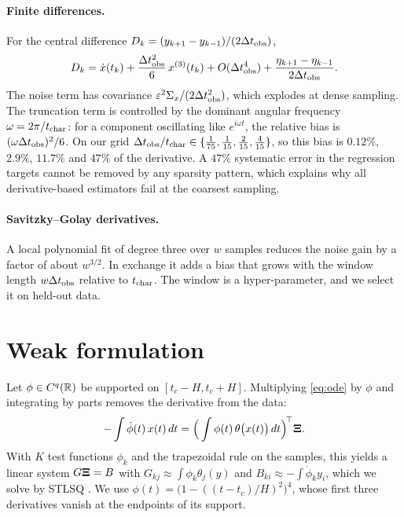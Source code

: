 \paragraph{Finite differences.} For the central difference $D_k=(y_{k+1}-y_{k-1})/(2\Delta t_{\mathrm{obs}})$,
\begin{equation}\label{eq:fd}
  D_k = \dot x(t_k) + \frac{\Delta t_{\mathrm{obs}}^2}{6}\,x^{(3)}(t_k) + O(\Delta t_{\mathrm{obs}}^4) + \frac{\eta_{k+1}-\eta_{k-1}}{2\Delta t_{\mathrm{obs}}}.
\end{equation}
The noise term has covariance $\varepsilon^2\Sigma_x/(2\Delta t_{\mathrm{obs}}^2)$, which explodes at dense sampling. The truncation term is controlled by the dominant angular frequency $\omega=2\pi/t_{\mathrm{char}}$: for a component oscillating like $e^{i\omega t}$, the relative bias is $(\omega\Delta t_{\mathrm{obs}})^2/6$. On our grid $\Delta t_{\mathrm{obs}}/t_{\mathrm{char}}\in\{\tfrac{1}{75},\tfrac{1}{15},\tfrac{2}{15},\tfrac{4}{15}\}$, so this bias is $0.12\%$, $2.9\%$, $11.7\%$ and $47\%$ of the derivative. A $47\%$ systematic error in the regression targets cannot be removed by any sparsity pattern, which explains why all derivative-based estimators fail at the coarsest sampling.

\paragraph{Savitzky--Golay derivatives.} A local polynomial fit of degree three over $w$ samples \parencite{savitzky1964} reduces the noise gain by a factor of about $w^{3/2}$. In exchange it adds a bias that grows with the window length $w\Delta t_{\mathrm{obs}}$ relative to $t_{\mathrm{char}}$. The window is a hyper-parameter, and we select it on held-out data.

\section{Weak formulation}

Let $\phi\in C^{q}(\mathbb{R})$ be supported on $[t_c-H,t_c+H]$. Multiplying \eqref{eq:ode} by $\phi$ and integrating by parts removes the derivative from the data:
\begin{equation}\label{eq:weak}
  -\int \dot\phi(t)\,x(t)\,dt = \Big(\int\phi(t)\,\theta\big(x(t)\big)\,dt\Big)^{\!\top}\bm{\Xi} .
\end{equation}
With $K$ test functions $\phi_k$ and the trapezoidal rule on the samples, this yields a linear system $G\bm{\Xi}=B$ with $G_{kj}\approx\int\phi_k\theta_j(y)$ and $B_{ki}\approx-\int\dot\phi_k y_i$, which we solve by STLSQ \parencite{messenger2021wsindy}. We use $\phi(t)=\big(1-((t-t_c)/H)^2\big)^{4}$, whose first three derivatives vanish at the endpoints of its support.

